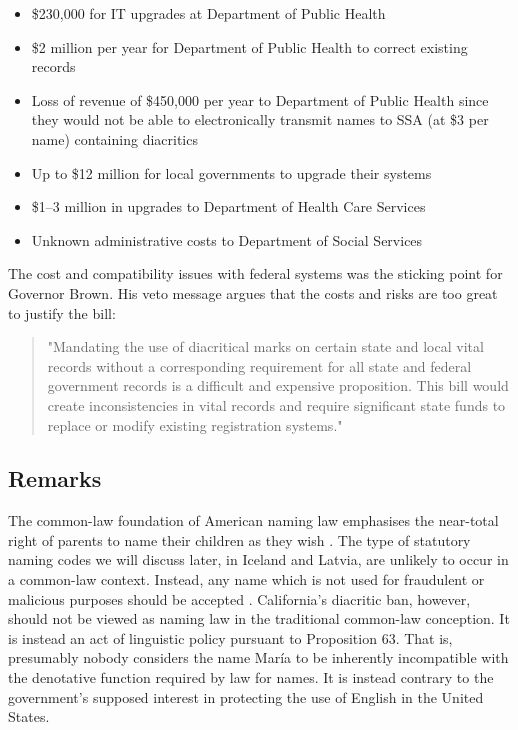 \begin{itemize}

\item \$230,000 for IT upgrades at Department of Public Health

\item \$2 million per year for Department of Public Health to correct existing
records

\item Loss of revenue of \$450,000 per year to Department of Public Health
since they would not be able to electronically transmit names to SSA (at \$3
per name) containing diacritics

\item Up to \$12 million for local governments to upgrade their systems

\item \$1--3 million in upgrades to Department of Health Care Services

\item Unknown administrative costs to Department of Social Services

\end{itemize}

The cost and compatibility issues with federal systems was the sticking point
for Governor Brown. His veto message argues that the costs and risks are too
great to justify the bill:

\begin{quote}
	"Mandating the use of diacritical marks on certain state and local vital
	records without a corresponding requirement for all state and federal
	government records is a difficult and expensive proposition. This bill would
	create inconsistencies in vital records and require significant state funds
	to replace or modify existing registration systems." \parencite{veto}
\end{quote}

\subsection{Remarks}

The common-law foundation of American naming law emphasises the near-total
right of parents to name their children as they wish \parencite{heymann11}. The
type of statutory naming codes we will discuss later, in Iceland and Latvia,
are unlikely to occur in a common-law context. Instead, any name which is not
used for fraudulent or malicious purposes should be accepted
\parencite{ferner96} \parencite{finch08} \parencite{heymann11}. California's
diacritic ban, however, should not be viewed as naming law in the traditional
common-law conception. It is instead an act of linguistic policy pursuant to
Proposition 63. That is, presumably nobody considers the name María to be
inherently incompatible with the denotative function required by law for names.
It is instead contrary to the government's supposed interest in protecting the
use of English in the United States.

